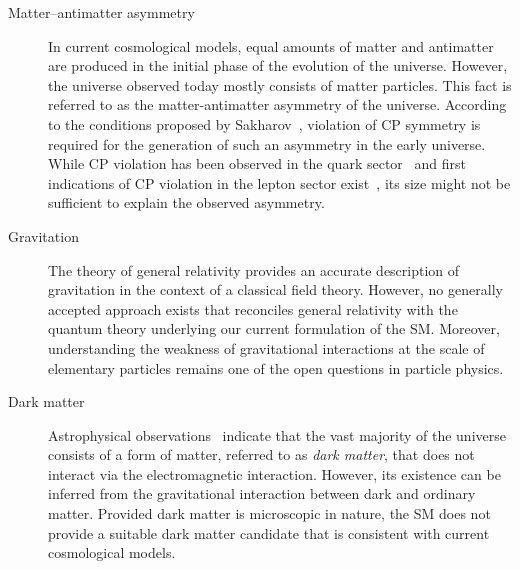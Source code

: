 \begin{description}

\item[Matter--antimatter asymmetry] In current cosmological models, equal amounts
  of matter and antimatter are produced in the initial phase of the evolution of
  the universe. However, the universe observed today mostly consists of matter
  particles. This fact is referred to as the matter-antimatter asymmetry of the
  universe. According to the conditions proposed by
  Sakharov~\cite{Sakharov:1967dj}, violation of CP symmetry is required for the
  generation of such an asymmetry in the early universe. While CP violation has
  been observed in the quark sector~\cite{Christenson:1964fg} and first
  indications of CP violation in the lepton sector exist~\cite{T2K:2019bcf}, its
  size might not be sufficient to explain the observed asymmetry.

\item[Gravitation] The theory of general relativity provides an accurate
  description of gravitation in the context of a classical field
  theory. However, no generally accepted approach exists that reconciles general
  relativity with the quantum theory underlying our current formulation of the
  SM. Moreover, understanding the weakness of gravitational interactions at the
  scale of elementary particles remains one of the open questions in particle
  physics.

\item[Dark matter] Astrophysical
  observations~\cite{Zwicky:1933gu,Zwicky:1937zza,Rubin:1970zza,Rubin:1980zd,Clowe:2006eq}
  indicate that the vast majority of the universe consists of a form of matter,
  referred to as \emph{dark matter}, that does not interact via the
  electromagnetic interaction. However, its existence can be inferred from the
  gravitational interaction between dark and ordinary matter. Provided dark
  matter is microscopic in nature, the SM does not provide a suitable dark
  matter candidate that is consistent with current cosmological models.


\end{description}
